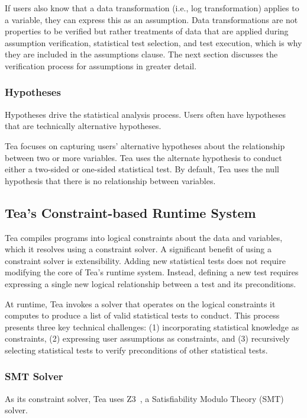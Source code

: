 If users also know that a data transformation (i.e., log transformation) applies
to a variable, they can express this as an assumption. Data transformations are
not properties to be verified but rather treatments of data that are applied
during assumption verification, statistical test selection, and test execution,
which is why they are included in the assumptions clause. The next section discusses the
verification process for assumptions in greater detail.

\subsubsection{Hypotheses}
Hypotheses drive the statistical analysis process. Users often have
hypotheses that are technically alternative hypotheses.

Tea focuses on capturing users' alternative hypotheses about the
relationship between two or more variables. Tea uses the alternate
hypothesis to conduct either a two-sided or one-sided statistical
test. By default, Tea uses the null hypothesis that there is no
relationship between variables.



\subsection{Tea's Constraint-based Runtime System} \label{sec:TeaRS}
Tea compiles programs into logical constraints about the data and
variables, which it resolves using a constraint solver. A significant
benefit of using a constraint solver is extensibility. Adding new
statistical tests does not require modifying the core of Tea's runtime
system. Instead, defining a new test requires expressing a single new
logical relationship between a test and its preconditions.

At runtime, Tea invokes a solver that operates on the logical
constraints it computes to produce a list of valid statistical tests
to conduct. This process presents three key technical challenges: (1)
incorporating statistical knowledge as constraints, (2) expressing
user assumptions as constraints, and (3) recursively selecting
statistical tests to verify preconditions of other statistical tests.

\subsubsection{SMT Solver}
As its constraint solver, Tea uses Z3~\cite{de2008z3}, a Satisfiability Modulo Theory (SMT) solver.


